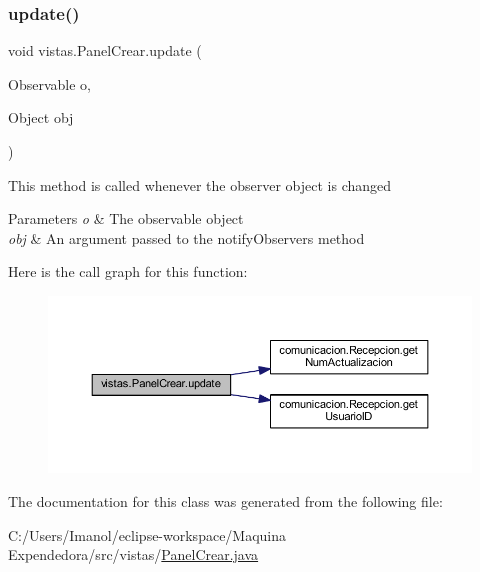 \subsubsection{\texorpdfstring{update()}{update()}}
{\footnotesize\ttfamily void vistas.\+Panel\+Crear.\+update (\begin{DoxyParamCaption}\item[{Observable}]{o,  }\item[{Object}]{obj }\end{DoxyParamCaption})}

This method is called whenever the observer object is changed 
\begin{DoxyParams}{Parameters}
{\em o} & The observable object \\
\hline
{\em obj} & An argument passed to the notify\+Observers method \\
\hline
\end{DoxyParams}
Here is the call graph for this function\+:
\nopagebreak
\begin{figure}[H]
\begin{center}
\leavevmode
\includegraphics[width=350pt]{classvistas_1_1_panel_crear_acf3b138f0c0c67c48a405b469eb37606_cgraph}
\end{center}
\end{figure}


The documentation for this class was generated from the following file\+:\begin{DoxyCompactItemize}
\item 
C\+:/\+Users/\+Imanol/eclipse-\/workspace/\+Maquina Expendedora/src/vistas/\mbox{\hyperlink{_panel_crear_8java}{Panel\+Crear.\+java}}\end{DoxyCompactItemize}
